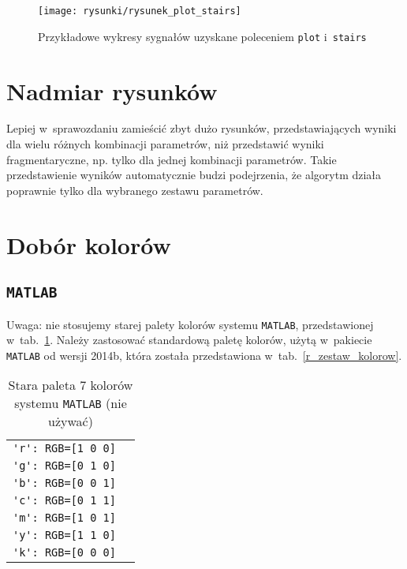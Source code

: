 \begin{figure}[H]
\centering
\texttt{[image: rysunki/rysunek\_plot\_stairs]}
\caption{Przykładowe wykresy sygnałów uzyskane poleceniem \texttt{plot} i~\texttt{stairs}}
\label{r_plot_stairs}
\end{figure}

\section{Nadmiar rysunków}
Lepiej w~sprawozdaniu zamieścić zbyt dużo rysunków, przedstawiających wyniki dla wielu różnych kombinacji parametrów, niż przedstawić wyniki fragmentaryczne, np. tylko dla jednej kombinacji parametrów. Takie przedstawienie wyników automatycznie budzi podejrzenia, że algorytm działa poprawnie tylko dla wybranego zestawu parametrów.

\section{Dobór kolorów}
\subsection{\texttt{MATLAB}}
Uwaga: nie stosujemy starej palety kolorów systemu \texttt{MATLAB}, przedstawionej w~tab.~\ref{r_zestaw_kolorow_MATLAB_historia}. Należy zastosować standardową paletę kolorów, użytą w~pakiecie \texttt{MATLAB} od wersji 2014b, która została przedstawiona w~tab.~\ref{r_zestaw_kolorow}.


\begin{table}[H]
\caption{Stara paleta 7 kolorów systemu \texttt{MATLAB} (nie używać)}
\label{r_zestaw_kolorow_MATLAB_historia}
\renewcommand{\arraystretch}{1.25}
	\centering
	\begin{small}
		\begin{tabular}{|p{3.5cm}|p{4cm}|}
			\hline
			\verb|'r': RGB=[1 0 0]| & \cellcolor{staryczerwony}\\
			\verb|'g': RGB=[0 1 0]| & \cellcolor{staryzielony}\\
			\verb|'b': RGB=[0 0 1]| & \cellcolor{staryniebieski}\\
			\verb|'c': RGB=[0 1 1]| & \cellcolor{staryjasnoniebieski}\\
			\verb|'m': RGB=[1 0 1]| & \cellcolor{staryfioletowy}\\
			\verb|'y': RGB=[1 1 0]| & \cellcolor{staryzolty}\\
			\verb|'k': RGB=[0 0 0]| & \cellcolor{czarny}\\
			\hline
		\end{tabular}
	\end{small}
\end{table}

